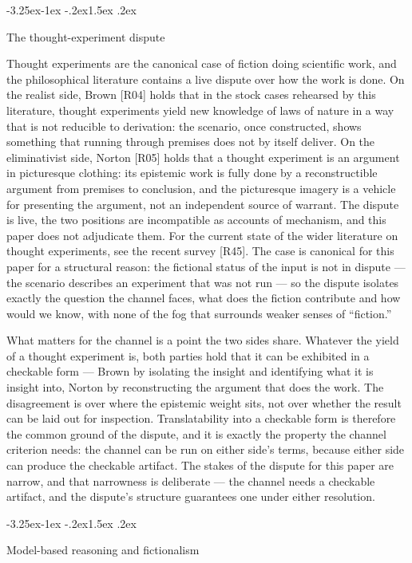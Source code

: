 \documentclass[11pt,a4paper]{article}
\makeatletter
\renewcommand\subsection{\@startsection{subsection}{2}{\z@}%
  {-3.25ex\@plus -1ex \@minus -.2ex}{1.5ex \@plus .2ex}%
  {\normalfont\large\bfseries\raggedright}}
\makeatother
\begin{document}
\subsection{The thought-experiment dispute}

Thought experiments are the canonical case of fiction doing scientific work, and the philosophical literature contains a live dispute over how the work is done. On the realist side, Brown [R04] holds that in the stock cases rehearsed by this literature, thought experiments yield new knowledge of laws of nature in a way that is not reducible to derivation: the scenario, once constructed, shows something that running through premises does not by itself deliver. On the eliminativist side, Norton [R05] holds that a thought experiment is an argument in picturesque clothing: its epistemic work is fully done by a reconstructible argument from premises to conclusion, and the picturesque imagery is a vehicle for presenting the argument, not an independent source of warrant. The dispute is live, the two positions are incompatible as accounts of mechanism, and this paper does not adjudicate them. For the current state of the wider literature on thought experiments, see the recent survey [R45]. The case is canonical for this paper for a structural reason: the fictional status of the input is not in dispute — the scenario describes an experiment that was not run — so the dispute isolates exactly the question the channel faces, what does the fiction contribute and how would we know, with none of the fog that surrounds weaker senses of ``fiction.''

What matters for the channel is a point the two sides share. Whatever the yield of a thought experiment is, both parties hold that it can be exhibited in a checkable form — Brown by isolating the insight and identifying what it is insight into, Norton by reconstructing the argument that does the work. The disagreement is over where the epistemic weight sits, not over whether the result can be laid out for inspection. Translatability into a checkable form is therefore the common ground of the dispute, and it is exactly the property the channel criterion needs: the channel can be run on either side's terms, because either side can produce the checkable artifact. The stakes of the dispute for this paper are narrow, and that narrowness is deliberate — the channel needs a checkable artifact, and the dispute's structure guarantees one under either resolution.

\subsection{Model-based reasoning and fictionalism}
\end{document}
